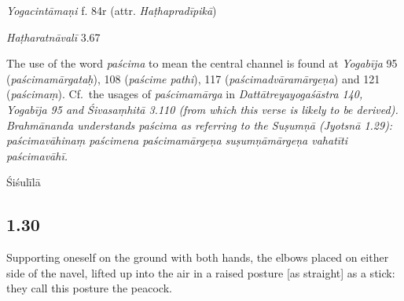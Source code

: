\begin{ekdosis}
\begin{testimonia}[hp01_029]
\emph{Yogacintāmaṇi} f. 84r (attr. \emph{Haṭhapradīpikā})

\begin{versinnote}
\end{versinnote}

\emph{Haṭharatnāvalī} 3.67

\begin{versinnote}
\end{versinnote}

\end{testimonia}

\begin{philcomm}[hp01_029]
 The use of the word \emph{paścima} to mean the central channel is found at \emph{Yogabīja} 95 (\emph{paścimamārgataḥ}), 108 (\emph{paścime pathi}), 117 (\emph{paścimadvāramārgeṇa}) and 121 (\emph{paścimaṃ}). Cf.~the usages of \emph{paścima\-mārga} in \sl{Dattātreyayogaśāstra} 140, \emph{Yogabīja} 95 and \emph{Śivasaṃhitā} 3.110 (from which this verse is likely to be derived). Brahmānanda understands \emph{paścima} as referring to the Suṣumṇā (\emph{Jyotsnā} 1.29): \emph{paścimavāhinaṃ paścimena paścimamārgeṇa suṣumṇāmārgeṇa vahatīti paścimavāhī}.
\end{philcomm}

\begin{metre}[hp01_029]
Śiśulīlā 
\end{metre}

\subsection*{1.30}
\begin{translation}[hp01_030]
Supporting oneself on the ground with both hands, the elbows placed on either side of the navel, lifted up into the air in a raised posture [as straight] as a stick: they call this posture the peacock.


\end{translation}
\end{ekdosis}
